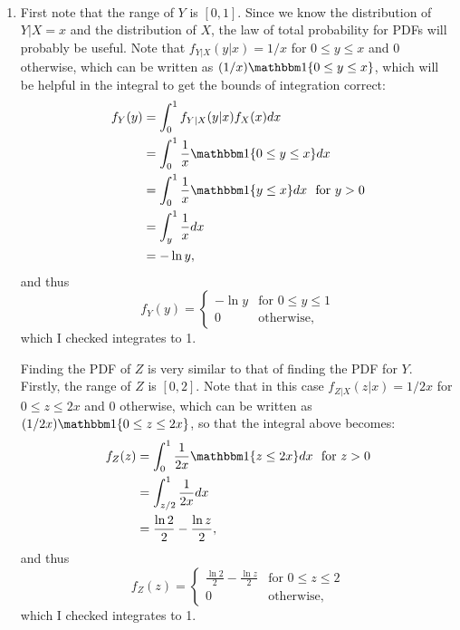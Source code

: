 \begin{problem}{14}$ $

\begin{enumerate}
\item  First note that the range of $Y$ is $[0, 1]$.  Since we know the distribution of $Y|X=x$ and the distribution of $X$, the law of total probability for PDFs will probably be useful.  Note that $f_{Y|X}(y|x) = 1/x$ for $0 \le y \le x$ and 0 otherwise, which can be written as $(1/x)\mathbbm 1 \{0 \le y \le x \}$, which will be helpful in the integral to get the bounds of integration correct:
\begin{align*}
f_Y(y)& = \int_0^1 f_{Y|X}(y|x)f_X(x)dx \\
&= \int_0^1\frac{1}{x}\mathbbm 1 \{0 \le y \le x \} dx \\
&= \int_0^1\frac{1}{x}\mathbbm 1 \{y \le x \} dx ~~\mathrm{for~}y>0\\
&=\int_y^1\frac{1}{x} dx \\
&= - \ln y,
\end{align*}
and thus
\[
  f_Y(y) =
  \begin{cases}
                                   -\ln y & \text{for $0\le y\le1$} \\
                                   0 & \text{otherwise},
  \end{cases}
\]
which I checked integrates to 1. 

Finding the PDF of $Z$ is very similar to that of finding the PDF for $Y$.  Firstly, the range of $Z$ is $[0, 2]$.  Note that in this case $f_{Z|X}(z|x) = 1/2x$ for $0 \le z \le 2x$ and 0 otherwise, which can be written as $(1/2x)\mathbbm 1 \{0 \le z \le 2x \}$, so that the integral above becomes:
\begin{align*}
f_Z(z) &= \int_0^1\frac{1}{2x}\mathbbm 1 \{z \le 2x \} dx ~~\mathrm{for~}z>0\\
&=\int_{z/2}^1\frac{1}{2x} dx \\
&= \frac{\ln 2}{2}- \frac{\ln z}{2},
\end{align*}
and thus
\[
  f_Z(z) =
  \begin{cases}
                                   \frac{\ln 2}{2}- \frac{\ln z}{2} & \text{for $0\le z\le 2$} \\
                                   0 & \text{otherwise},
  \end{cases}
\]
which I checked integrates to 1. 


\end{enumerate}
\end{problem}
